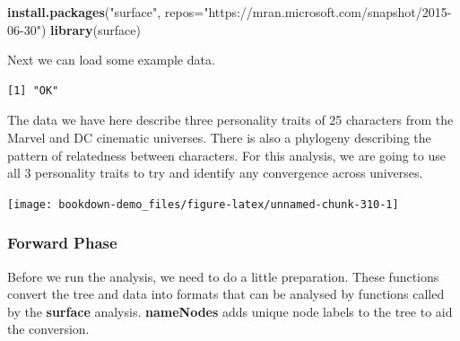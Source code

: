 \documentclass[
]{book}
\newenvironment{Shaded}{\begin{snugshade}}{\end{snugshade}}
\newcommand{\DataTypeTok}[1]{\textcolor[rgb]{0.13,0.29,0.53}{#1}}
\newcommand{\KeywordTok}[1]{\textcolor[rgb]{0.13,0.29,0.53}{\textbf{#1}}}
\newcommand{\NormalTok}[1]{#1}
\newcommand{\OperatorTok}[1]{\textcolor[rgb]{0.81,0.36,0.00}{\textbf{#1}}}
\newcommand{\StringTok}[1]{\textcolor[rgb]{0.31,0.60,0.02}{#1}}
\begin{document}
\begin{Shaded}
\begin{Highlighting}[]
\KeywordTok{install.packages}\NormalTok{(}\StringTok{"surface"}\NormalTok{, }\DataTypeTok{repos=}\StringTok{"https://mran.microsoft.com/snapshot/2015{-}06{-}30"}\NormalTok{)}
\KeywordTok{library}\NormalTok{(surface)}
\end{Highlighting}
\end{Shaded}

Next we can load some example data.

\begin{Shaded}
\end{Shaded}

\begin{verbatim}
[1] "OK"
\end{verbatim}

The data we have here describe three personality traits of 25 characters from the Marvel and DC cinematic universes. There is also a phylogeny describing the pattern of relatedness between characters. For this analysis, we are going to use all 3 personality traits to try and identify any convergence across universes.

\begin{center}\texttt{[image: bookdown-demo\_files/figure-latex/unnamed-chunk-310-1]} \end{center}

\hypertarget{forward-phase}{%
\subsubsection{Forward Phase}\label{forward-phase}}

Before we run the analysis, we need to do a little preparation. These functions convert the tree and data into formats that can be analysed by functions called by the \textbf{surface} analysis. \textbf{nameNodes} adds unique node labels to the tree to aid the conversion.
\end{document}
